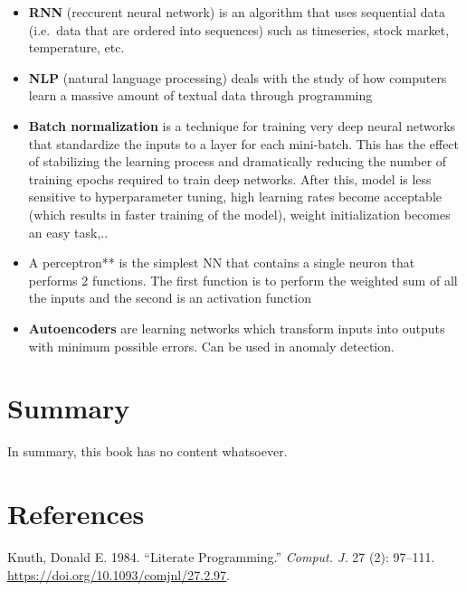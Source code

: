 \documentclass[
  letterpaper,
  DIV=11,
  numbers=noendperiod]{scrreprt}
\providecommand{\tightlist}{%
  \setlength{\itemsep}{0pt}\setlength{\parskip}{0pt}}\usepackage{longtable,booktabs,array}
\newlength{\cslhangindent}
\newlength{\cslentryspacingunit} %
\newenvironment{CSLReferences}[2] %
 {%
  \setlength{\parindent}{0pt}
  \ifodd #1
  \let\oldpar\par
  \def\par{\hangindent=\cslhangindent\oldpar}
  \fi
  \setlength{\parskip}{#2\cslentryspacingunit}
 }%
 {}
\begin{document}
\begin{itemize}
\tightlist
\item
  \textbf{RNN} (reccurent neural network) is an algorithm that uses
  sequential data (i.e.~data that are ordered into sequences) such as
  timeseries, stock market, temperature, etc.
\item
  \textbf{NLP} (natural language processing) deals with the study of how
  computers learn a massive amount of textual data through programming
\item
  \textbf{Batch normalization} is a technique for training very deep
  neural networks that standardize the inputs to a layer for each
  mini-batch. This has the effect of stabilizing the learning process
  and dramatically reducing the number of training epochs required to
  train deep networks. After this, model is less sensitive to
  hyperparameter tuning, high learning rates become acceptable (which
  results in faster training of the model), weight initialization
  becomes an easy task,..
\item
  A perceptron** is the simplest NN that contains a single neuron that
  performs 2 functions. The first function is to perform the weighted
  sum of all the inputs and the second is an activation function
\item
  \textbf{Autoencoders} are learning networks which transform inputs
  into outputs with minimum possible errors. Can be used in anomaly
  detection.
\end{itemize}


\hypertarget{summary}{%
\chapter{Summary}\label{summary}}

In summary, this book has no content whatsoever.


\hypertarget{references}{%
\chapter*{References}\label{references}}


\hypertarget{refs}{}
\begin{CSLReferences}{1}{0}
\leavevmode{}%
Knuth, Donald E. 1984. {``Literate Programming.''} \emph{Comput. J.} 27
(2): 97--111. \url{https://doi.org/10.1093/comjnl/27.2.97}.

\end{CSLReferences}
\end{document}
